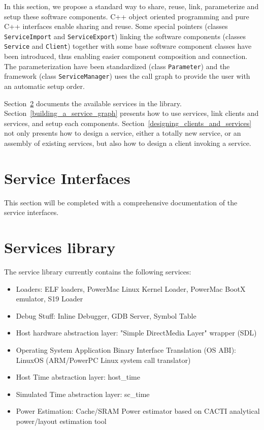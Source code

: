 In this section, we propose a standard way to share, reuse, link, parameterize and setup these software components.
C++ object oriented programming and pure C++ interfaces enable sharing and reuse.
Some special pointers (classes \texttt{ServiceImport} and \texttt{ServiceExport}) linking the software components (classes \texttt{Service} and \texttt{Client}) together with some base software component classes have been introduced, thus enabling easier component composition and connection.
The parameterization have been standardized (class \texttt{Parameter}) and the framework (class \texttt{ServiceManager}) uses the call graph to provide the user with an automatic setup order.

Section~\ref{services_library} documents the available services in the library. Section~\ref{building_a_service_graph} presents how to use services, link clients and services, and setup each components. Section~\ref{designing_clients_and_services} not only presents how to design a service, either a totally new service, or an assembly of existing services, but also how to design a client invoking a service.


\section{Service Interfaces}
\label{service_interfaces}

This section will be completed with a comprehensive documentation of the service interfaces.

\section{Services library}
\label{services_library}

The service library currently contains the following services:
\begin{itemize}
	\item Loaders: ELF loaders, PowerMac Linux Kernel Loader, PowerMac BootX emulator, S19 Loader
	\item Debug Stuff: Inline Debugger, GDB Server, Symbol Table
	\item Host hardware abstraction layer: "Simple DirectMedia Layer" wrapper (SDL)
	\item Operating System Application Binary Interface Translation (OS ABI): LinuxOS (ARM/PowerPC Linux system call translator)
	\item Host Time abstraction layer: host\_time
	\item Simulated Time abstraction layer: sc\_time
	\item Power Estimation: Cache/SRAM Power estimator based on CACTI analytical power/layout estimation tool
\end{itemize}

